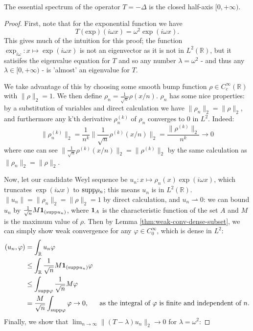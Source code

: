 \documentclass[../main.tex]{subfiles}
\begin{document}
\begin{proposition}
The essential spectrum of the operator $T = -\Delta$ is the closed half-axis $[0, +\infty)$.
\end{proposition}
\begin{proof}
First, note that for the exponential function we have 
\begin{equation}\label{eqn:laplace-eigenvector}
T(\text{exp})(i\omega x) = \omega^2 \exp(i\omega x).
\end{equation}
This gives much of the intuition for this proof; the function $\exp_{i \omega}: x \mapsto \exp(i\omega x)$ is not an eigenvector 
as it is not in $L^2(\mathbb{R})$, but it satisifes the eigenvalue equation for $T$ and so any number $\lambda = \omega^2$ -
and thus any $\lambda \in [0, +\infty)$ - is 'almost' an eigenvalue for $T$.

We take advantage of this by choosing some smooth bump function $\rho \in C^\infty_c(\mathbb{R})$ with $\|\rho\|_2 = 1$. We
then define $\rho_n = \frac{1}{\sqrt{n}}\rho(x/n)$. $\rho_n$ has some nice properties: by a substitution of variables and direct calculation we have $\|\rho_n\|_2 = \|\rho\|_2$, and furthermore any k'th derivative $\rho_n^{(k)}$ of $\rho_n$ 
converges to 0 in $L^2$. Indeed:
\begin{equation}\label{eqn:rhokn-vanishes}
\|\rho_n^{(k)}\|_2 = \frac{1}{n^k}\|\frac{1}{\sqrt{n}}\rho^{(k)}(x/n)\|_2 = \frac{\|\rho^{(k)}\|_2}{n^k} \rightarrow 0
\end{equation}
where one can see $\|\frac{1}{\sqrt{n}}\rho^{(k)}(x/n)\|_2 = \|\rho^{(k)}\|_2$ by the same calculation as  $\|\rho_n\|_2 = \|\rho\|_2$.

Now, let our candidate Weyl sequence be $u_n: x \mapsto \rho_n(x)\exp(i\omega x)$,
which truncates $\exp(i\omega x)$ to $\mathrm{supp} \rho_n$; this means $u_n$ is in $L^2(\mathbb{R})$.
$\|u_n\| = \|\rho_n\|_2 = \|\rho\|_2 = 1$ by direct calculation, and $u_n \rightharpoonup 0$: we can bound $u_n$ by $\frac{1}{\sqrt{n}} M \mathbf{1}_{(\mathrm{supp} u_n)}$, where $\mathbf{1}_A$ is the characteristic function of the set $A$ and $M$ is the maximum value of $\rho$. Then by Lemma \ref{thm:weak-conv-dense-subset}, we can simply show weak convergence for any $\varphi \in C_0^\infty$, which is dense in $L^2$:
\begin{align*}
( u_n, \varphi ) & = \int_{\mathbb{R}}u_n \varphi & \\
& \leq \int_{\mathbb{R}} \frac{1}{\sqrt{n}} M \mathbf{1}_{(\mathrm{supp} u_n)} \varphi & \\
& \leq \int_{\mathrm{supp} \varphi} \frac{1}{\sqrt{n}} M  \varphi & \\
& = \frac{M}{\sqrt{n}} \int_{\mathrm{supp} \varphi} \varphi \rightarrow 0, & \text{as the integral of $\varphi$ is finite and independent of $n$.}
\end{align*}
Finally, we show that $\lim_{n \rightarrow \infty}\|(T - \lambda)u_n\|_2  \rightarrow 0$ for $\lambda = \omega^2$:


\end{proof}
\end{document}
